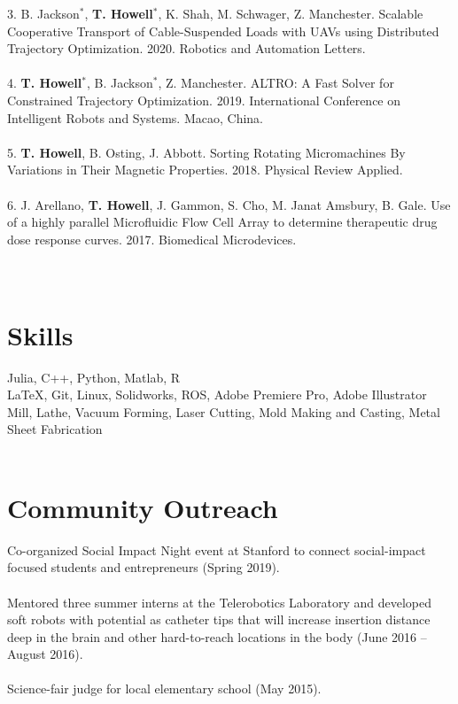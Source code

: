 \documentclass[margin,line]{res}
\begin{document}
\begin{resume}
3. B. Jackson$^*$, \textbf{T. Howell}$^*$, K. Shah, M. Schwager, Z. Manchester. Scalable Cooperative Transport of Cable-Suspended Loads with UAVs using Distributed Trajectory Optimization. 2020. Robotics and Automation Letters.\\
\\
4. \textbf{T. Howell}$^*$, B. Jackson$^*$, Z. Manchester. ALTRO: A Fast Solver for Constrained Trajectory Optimization. 2019. International Conference on Intelligent Robots and Systems. Macao, China.\\
\\
5. \textbf{T. Howell}, B. Osting, J. Abbott. Sorting Rotating Micromachines By Variations in Their Magnetic
Properties. 2018. Physical Review Applied.\\
\\
6. J. Arellano, \textbf{T. Howell}, J. Gammon, S. Cho, M. Janat Amsbury, B. Gale. Use of a highly parallel
Microfluidic Flow Cell Array to determine therapeutic drug dose response curves. 2017. Biomedical
Microdevices.\\
\\
\\
\section{\sc Skills}
Julia, C++, Python, Matlab, R\\
\LaTeX, Git, Linux, Solidworks, ROS, Adobe Premiere Pro, Adobe Illustrator \\
Mill, Lathe, Vacuum Forming, Laser Cutting, Mold Making and Casting, Metal Sheet Fabrication\\
\\
\section{\sc Community Outreach}
Co-organized Social Impact Night event at Stanford to connect social-impact focused students and entrepreneurs (Spring 2019).\\
\\
Mentored three summer interns at the Telerobotics Laboratory and developed soft robots with potential as catheter tips that will increase insertion distance deep in the brain and other hard-to-reach locations in the body (June 2016 – August 2016).\\
\\
Science-fair judge for local elementary school (May 2015).\\
\\

\end{resume}
\end{document}
